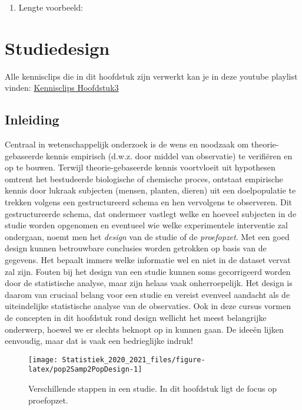 \documentclass[
  12pt,dutch,coursenotes]{book}
\providecommand{\tightlist}{%
  \setlength{\itemsep}{0pt}\setlength{\parskip}{0pt}}
\theoremstyle{definition}
\theoremstyle{definition}
\theoremstyle{definition}
\theoremstyle{remark}
\begin{document}
\begin{enumerate}
\def\labelenumi{\arabic{enumi}.}
\setcounter{enumi}{1}
\tightlist
\item
  Lengte voorbeeld:
\end{enumerate}

\hypertarget{chap:design}{%
\chapter{Studiedesign}\label{chap:design}}

Alle kennisclips die in dit hoofdstuk zijn verwerkt kan je in deze youtube playlist vinden: \href{https://www.youtube.com/playlist?list=PLZH1hP8_LbJL1GjhnpEDlx78OJ6qUzSix}{Kennisclips Hoofdstuk3}

\hypertarget{inleiding}{%
\section{Inleiding}\label{inleiding}}

Centraal in wetenschappelijk onderzoek is de wens en noodzaak om
theorie-gebaseerde kennis empirisch (d.w.z. door middel van observatie) te
verifiëren en op te bouwen. Terwijl theorie-gebaseerde kennis voortvloeit uit hypothesen
omtrent het bestudeerde biologische of chemische proces, ontstaat empirische
kennis door lukraak subjecten (mensen, planten, dieren) uit een doelpopulatie te
trekken volgens een gestructureerd schema en hen vervolgens te observeren.
Dit gestructureerde schema, dat ondermeer vastlegt welke en hoeveel
subjecten in de studie worden opgenomen en eventueel wie welke experimentele
interventie zal ondergaan, noemt men het \emph{design} van de studie of de
\emph{proefopzet}. Met een goed design kunnen betrouwbare conclusies
worden getrokken op basis van de gegevens. Het bepaalt immers welke
informatie wel en niet in de dataset vervat zal zijn. Fouten bij het design
van een studie kunnen soms gecorrigeerd worden door de statistische analyse,
maar zijn helaas vaak onherroepelijk. Het design is daarom van cruciaal
belang voor een studie en vereist evenveel aandacht als de uiteindelijke
statistische analyse van de observaties. Ook in deze cursus vormen de
concepten in dit hoofdstuk rond design wellicht het meest
belangrijke onderwerp, hoewel we er slechts beknopt op in kunnen gaan. De
ideeën lijken eenvoudig, maar dat is vaak een bedrieglijke indruk!

\begin{figure}

{\centering \texttt{[image: Statistiek\_2020\_2021\_files/figure-latex/pop2Samp2PopDesign-1]} 

}

\caption{Verschillende stappen in een studie. In dit hoofdstuk ligt de focus op proefopzet.}\label{fig:pop2Samp2PopDesign}
\end{figure}
\end{document}
